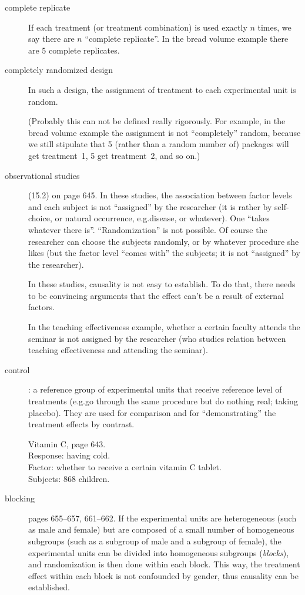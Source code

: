 \documentclass[12pt]{article}
\begin{document}
\begin{description}
\item[complete replicate]
If each treatment (or treatment combination) is used exactly $n$ times,
we say there are $n$ ``complete replicate''.
In the bread volume example there are 5 complete replicates.

\item[completely randomized design]
In such a design, the assignment of treatment to each experimental unit
is random.

(Probably this can not be defined really rigorously.
For example, in the bread volume example the assignment is not
``completely'' random, because we still stipulate that 5
(rather than a random number of) packages will
get treatment~1, 5 get treatment~2, and so on.)

\item[observational studies] (15.2) on page 645.
In these studies, the association between factor levels and each subject
is not ``assigned'' by the researcher (it is rather by self-choice, or
natural occurrence, e.g.\@ disease, or whatever). One ``takes whatever
there is''. ``Randomization'' is not possible. Of course the researcher
can choose the subjects randomly, or by whatever procedure she likes
(but the factor level ``comes with'' the subjects; it is not
``assigned'' by the researcher).

In these studies, causality is not easy to establish.
To do that, there needs to be convincing arguments that the effect can't
be a result of external factors.

In the teaching effectiveness example,
whether a certain faculty attends the seminar is not assigned by the
researcher (who studies relation between teaching effectiveness and
attending the seminar).

\item[control]: a reference group of experimental units that receive
reference level of treatments (e.g.\@ go through the same procedure but
do nothing real; taking placebo).
They are used for comparison and for ``demonstrating''
the treatment effects by contrast.

\example
Vitamin C, page 643.\\
Response: having cold.\\
Factor: whether to receive a certain vitamin C tablet.\\
Subjects: 868 children.

\item[blocking] pages 655--657, 661--662.
If the experimental units are heterogeneous (such as male and female)
but are composed of a small number of homogeneous subgroups
(such as a subgroup of male and a subgroup of female),
the experimental units can be divided into homogeneous subgroups
(\emph{blocks}), and randomization is then done within each block.
This way, the treatment effect within each block is not confounded by
gender, thus causality can be established.


\end{description}
\end{document}
